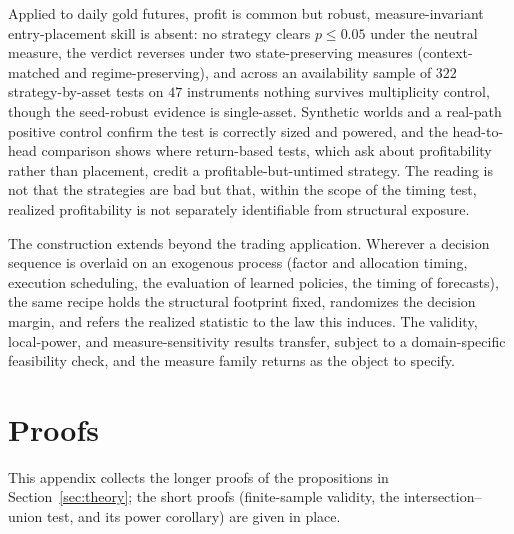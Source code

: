 \documentclass[preprint,12pt]{elsarticle}
\theoremstyle{definition}
\begin{document}
Applied to daily gold futures, profit is common but
robust, measure-invariant entry-placement skill is absent: no strategy clears
$p\le0.05$ under the neutral measure, the verdict reverses under two state-preserving measures (context-matched and regime-preserving), and across an availability sample of $322$ strategy-by-asset tests on $47$ instruments
nothing survives multiplicity control, though the seed-robust evidence is single-asset. Synthetic worlds and a real-path positive control
confirm the test is correctly sized and powered, and the head-to-head comparison
shows where return-based tests, which ask about profitability rather than placement,
credit a profitable-but-untimed strategy. The reading is not that the strategies are
bad but that, within the scope of the timing test, realized profitability is not
separately identifiable from structural exposure.

The construction extends beyond the trading application. Wherever a decision sequence is overlaid on an
exogenous process (factor and allocation timing, execution scheduling, the
evaluation of learned policies, the timing of forecasts), the same recipe holds
the structural footprint fixed, randomizes the decision margin, and refers the
realized statistic to the law this induces. The validity, local-power, and
measure-sensitivity results transfer, subject to a domain-specific feasibility check, and the
measure family returns as the object to specify.


\appendix

\section{Proofs}
\label{app:proofs}

This appendix collects the longer proofs of the propositions in Section~\ref{sec:theory}; the short proofs (finite-sample validity, the intersection--union test, and its power corollary) are given in place.
\end{document}
